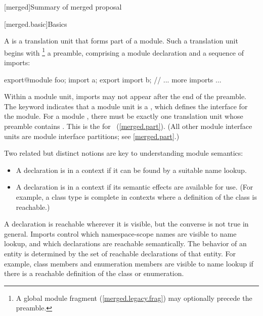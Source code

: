 [merged]{Summary of merged proposal}

[merged.basic]{Basics}

\pnum
A  is a translation unit that forms part of a module.
Such a translation unit begins with%
\footnote{A global module fragment (\ref{merged.legacy.frag}) may optionally
precede the preamble.}
a preamble,
comprising a module declaration
and a sequence of imports:

\begin{codeblock}
export@\opt@ module foo;
import a;
export import b;
// ... more imports ...
\end{codeblock}

Within a module unit, imports may not appear after the end of the preamble.
The  keyword indicates that a module unit is a
, which defines the interface for the module.
For a module , there must be exactly one
translation unit whose preamble contains .
This is the 
for ~(\ref{merged.part}).
(All other module interface units are module interface partitions;
see \ref{merged.part}.)

\pnum
Two related but distinct notions are key to understanding module semantics:
\begin{itemize}
\item A declaration is  in a context if it can be found by a
suitable name lookup.
\item A declaration is  in a context if its semantic effects
are available for use. (For example, a class type is complete in contexts
where a definition of the class is reachable.)
\end{itemize}
A declaration is reachable wherever it is visible, but the converse is not true
in general.
Imports control which namespace-scope names are visible to name lookup,
and which declarations are reachable semantically.
The behavior of an entity is determined by
the set of reachable declarations of that entity.
For example, class members and enumeration members are visible to name lookup
if there is a reachable definition of the class or enumeration.
 
